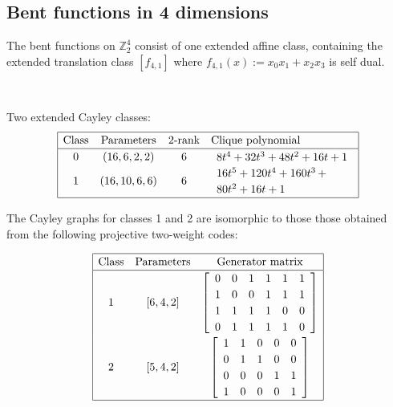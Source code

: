 \documentclass[12pt,a4paper]{article}
\newcommand{\mb}[1]{\mathbb{#1}}
\newcommand{\Z}{\mb{Z}}
\begin{document}
\begin{figure}[!ht]
\begin{minipage}{.48\textwidth}
  \label{fig:c2_1_bent_cayley_graph_index_matrix}
\end{minipage}
\end{figure}

\subsection{Bent functions in 4 dimensions}

The bent functions on $\Z_2^4$ consist of one extended affine class, containing the extended translation class $[f_{4,1}]$ where
$f_{4,1}(x) := x_0 x_1 + x_2 x_3$ is self dual.

~

Two extended Cayley classes:
\begin{align*}
\def\arraystretch{1.2}
\begin{array}{|cccl|}
\hline
\text{Class} &
\text{Parameters} &
\text{2-rank} &
\text{Clique polynomial}
\\
\hline
0 &
(16, 6, 2, 2) &
6 &
\begin{array}{l}
8t^{4} + 32t^{3} + 48t^{2} + 16t + 1
\end{array}
\\
1 &
(16, 10, 6, 6) &
6 &
\begin{array}{l}
16t^{5} + 120t^{4} + 160t^{3}
\,+
\\
 80t^{2} + 16t + 1
\end{array}
\\
\hline
\end{array}
\end{align*}

The Cayley graphs for classes 1 and 2 are isomorphic to those those obtained from the following
projective two-weight codes:

\begin{align*}
\begin{array}{|ccc|}
\hline
\text{Class} &
\text{Parameters} & \text{Generator matrix}
\\
\hline
1 &
[6, 4, 2] &
\left[
\begin{array}{cccccc}
0 & 0 & 1 & 1 & 1 & 1
\\
1 & 0 & 0 & 1 & 1 & 1
\\
1 & 1 & 1 & 1 & 0 & 0
\\
0 & 1 & 1 & 1 & 1 & 0
\end{array}
\right]
\\
2 &
[5, 4, 2] &
\left[
\begin{array}{ccccc}
1 & 1 & 0 & 0 & 0
\\
0 & 1 & 1 & 0 & 0
\\
0 & 0 & 0 & 1 & 1
\\
1 & 0 & 0 & 0 & 1
\end{array}
\right]
\\
\hline
\end{array}
\end{align*}
\end{document}

